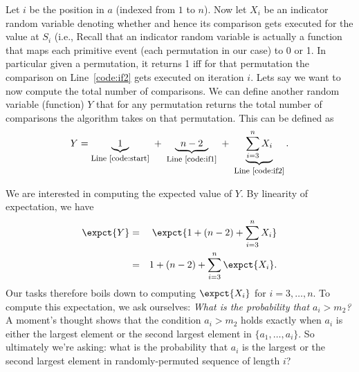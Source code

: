 {Let $i$ be the position in $a$ (indexed from $1$ to $n$).  Now
let $X_i$ be an indicator random variable denoting whether
 and hence its comparison gets executed for the
value at $S_i$ (i.e., Recall that an indicator random variable
is actually a function that maps each primitive event (each
permutation in our case) to 0 or 1.  In particular given a
permutation, it returns 1 iff for that permutation the comparison on
Line~\ref{code:if2} gets executed on iteration $i$.  Lets say we want
to now compute the total number of comparisons.  We can define another
random variable (function) $Y$ that for any permutation returns the
total number of comparisons the algorithm takes on that permutation.
This can be defined as
\[
Y = \underbrace{\;\;1\;\;}_{\text{\footnotesize Line~\ref{code:start}}} \,\,+\,\,
\underbrace{\;\;n - 2\;\;}_{\text{\footnotesize Line~\ref{code:if1}}} \,\, + \,\,
\underbrace{\sum_{i=3}^n X_i}_{\text{\footnotesize Line~\ref{code:if2}}}
.
\]

We are interested in computing the expected value of $Y$.
%
By linearity of
expectation, we have
\begin{eqnarray*}
  \expct{Y} & = & \expct{1 + (n-2) + \sum_{i=3}^n X_i}\\
            & = &  1 + (n-2) + \sum_{i=3}^n \expct{X_i}.
\end{eqnarray*}
Our tasks therefore boils down to computing $\expct{X_i}$ for $i = 3,
\dots, n$.  To compute this expectation, we ask ourselves: \emph{What
  is the probability that $a_i > m_2$?}  A moment's thought shows that
the condition $a_i > m_2$ holds exactly when $a_i$ is either the
largest element or the second largest element in $\{a_1, \dots,
a_i\}$.  So ultimately we're asking: what is the probability that
$a_i$ is the largest or the second largest element in
randomly-permuted sequence of length $i$?

}
